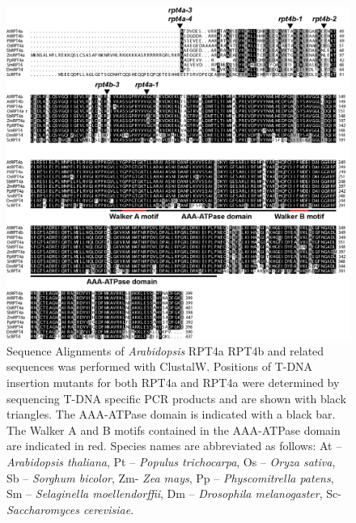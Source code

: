 \beginsupplement
\begin{figure}[ht]
	\centering
	\includegraphics[width=\columnwidth]{Proteasome/suprpt4mut.png}
	{Sequence Alignments of \textit{Arabidopsis} RPT4a RPT4b and related sequences was performed with ClustalW. Positions of T-DNA insertion mutants for both RPT4a and RPT4a were determined by sequencing T-DNA specific PCR products and are shown with black triangles. The AAA-ATPase domain is indicated with a black bar. The Walker A and B motifs contained in the AAA-ATPase domain are indicated in red. Species names are abbreviated as follows: At – \textit{Arabidopsis thaliana}, Pt – \textit{Populus trichocarpa}, Os – \textit{Oryza sativa}, Sb – \textit{Sorghum bicolor}, Zm- \textit{Zea mays}, Pp – \textit{Physcomitrella patens}, Sm – \textit{Selaginella moellendorffii}, Dm – \textit{Drosophila melanogaster}, Sc- \textit{Saccharomyces cerevisiae}.}
	\label{fig:suprpt4}
\end{figure}

